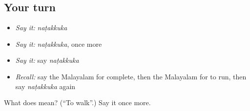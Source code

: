 \subsection*{Your turn}
\begin{itemize}
\raggedright
  \item \emph{Say it:} \emph{naṭakkuka}
  \item \emph{Say it:} \emph{naṭakkuka}, once more
  \item \emph{Say it:} say \emph{naṭakkuka}
  \item \emph{Recall:} say the Malayalam for complete, then the Malayalam for to run, then say \emph{naṭakkuka} again
\end{itemize}

\begin{tcolorbox}[breakable,colback=teal!4,colframe=teal!35!black,title={Before you move on}]
What does  mean? (\textquotedblleft{}To walk\textquotedblright{}.) Say it once more.
\end{tcolorbox}
